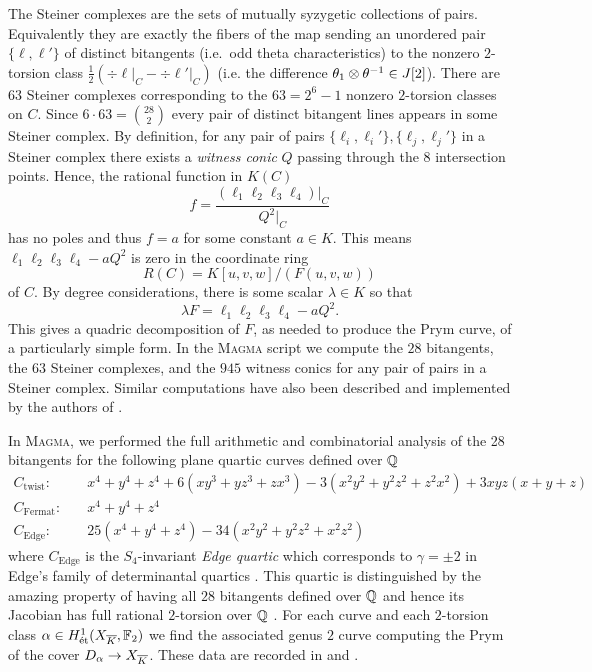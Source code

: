 \documentclass[main.tex]{subfiles}
\begin{document}
The Steiner complexes are the sets of mutually syzygetic collections of pairs. Equivalently they are exactly the fibers of the map sending an unordered pair $\{ \ell, \ell'\}$ of distinct bitangents (i.e.\ odd theta characteristics) to the nonzero $2$-torsion class $\frac{1}{2} (\div{\ell |_C} - \div{\ell'|_C})$ (i.e. the difference $\theta_1 \otimes \theta^{-1} \in J[2]$). There are $63$ Steiner complexes corresponding to the $63 = 2^6 - 1$ nonzero $2$-torsion classes on $C$. Since $6 \cdot 63 = { 28 \choose 2 }$ every pair of distinct bitangent lines appears in some Steiner complex. By definition, for any pair of pairs $\{ \ell_i, \ell_i' \}, \{ \ell_j, \ell_j' \}$ in a Steiner complex there exists a \textit{witness conic} $Q$ passing through the $8$ intersection points. Hence, the rational function in $K(C)$ 
\[ f = \frac{(\ell_1 \ell_2 \ell_3 \ell_4) |_C}{Q^2|_C} \]
has no poles and thus $f = a$ for some constant $a \in K$. This means $\ell_1 \ell_2 \ell_3 \ell_4 - a Q^2$ is zero in the coordinate ring
\[ R(C) = K[u,v,w]/(F(u,v,w)) \]
of $C$. By degree considerations, there is some scalar $\lambda \in K$ so that
\[ \lambda F = \ell_1 \ell_2 \ell_3 \ell_4 - a Q^2. \]
This gives a quadric decomposition of $F$, as needed to produce the Prym curve, of a particularly simple form. In the \textsc{Magma} script \cite[\texttt{steiner\_computations.m}]{church:github} we compute the $28$ bitangents, the $63$ Steiner complexes, and the $945$ witness conics for any pair of pairs in a Steiner complex. Similar computations have also been described and implemented by the authors of \cite{sturmfels:bitangent_computation}.
\par 
In \textsc{Magma}, we performed the full arithmetic and combinatorial analysis of the 28 bitangents for the following plane quartic curves defined over $\mathbb{Q}$
\begin{align*}
C_{\mathrm{twist}} : \quad & x^4 + y^4 + z^4 + 6(xy^3 + yz^3 + zx^3) - 3(x^2 y^2 + y^2 z^2 + z^2 x^2) + 3xyz(x+y+z) 
\\
C_{\mathrm{Fermat}} : \quad & x^4 + y^4 + z^4 
\\
C_{\mathrm{Edge}} : \quad & 25(x^4 + y^4 + z^4) - 34(x^2 y^2 + y^2 z^2 + x^2 z^2) 
\end{align*}
where $C_{\mathrm{Edge}}$ is the $S_4$-invariant \textit{Edge quartic} which corresponds to $\gamma = \pm 2$ in Edge's family of determinantal quartics \cite[p.19]{edge:1938}. This quartic is distinguished by the amazing property of having all $28$ bitangents defined over $\mathbb{Q}$ and hence its Jacobian has full rational $2$-torsion over $\mathbb{Q}$ \cite[p.2]{sturmfels:bitangent_computation}. For each curve and each $2$-torsion class $\alpha \in H^1_{\mathrm{\acute{e}t}}(X_{\overline{K}}, \mathbb{F}_2)$ we find the associated genus $2$ curve computing the Prym of the cover $D_{\alpha} \to X_{\overline{K}}$. These data are recorded in \cite[\texttt{PRYM\_INVARIANTS.md}]{church:github} and \cite[\texttt{prym\_table.md}]{church:github}.
\end{document}
